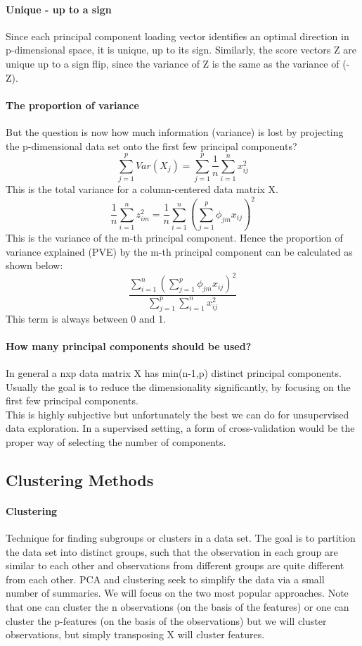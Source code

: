 \documentclass[../document.tex]{subfiles}
\begin{document}
	\paragraph{Unique - up to a sign}
	Since each principal component loading vector identifies an optimal direction in p-dimensional space, it is unique, up to its sign. Similarly, the score vectors Z are unique up to a sign flip, since the variance of Z is the same as the variance of (-Z).
	\paragraph{The proportion of variance}
	But the question is now how much information (variance) is lost by projecting the p-dimensional data set onto the first few principal components?
	\begin{equation}
		\sum_{j=1}^{p}Var(X_{j})=\sum_{j=1}^{p}\frac{1}{n}\sum_{i=1}^{n}x_{ij}^2
	\end{equation}
	This is the total variance for a column-centered data matrix X.
	\begin{equation}
		\frac{1}{n}\sum_{i=1}^{n}z_{im}^2=\frac{1}{n}\sum_{i=1}^{n}(\sum_{j=1}^{p}\phi_{jm}x_{ij})^2
	\end{equation}
	This is the variance of the m-th principal component. Hence the proportion of variance explained (PVE) by the m-th principal component can be calculated as shown below:
	\begin{equation}
		\frac{\sum_{i=1}^{n}(\sum_{j=1}^{p}\phi_{jm}x_{ij})^2}{\sum_{j=1}^{p}\sum_{i=1}^{n}x_{ij}^2}
	\end{equation}
	This term is always between 0 and 1.
	\paragraph{How many principal components should be used?}
	In general a nxp data matrix X has min(n-1,p) distinct principal components. Usually the goal is to reduce the dimensionality significantly, by focusing on the first few principal components.\\
	This is highly subjective but unfortunately the best we can do for unsupervised data exploration. In a supervised setting, a form of cross-validation would be the proper way of selecting the number of components.
	\subsection{Clustering Methods}
	\paragraph{Clustering}
	Technique for finding subgroups or clusters in a data set. The goal is to partition the data set into distinct groups, such that the observation in each group are similar to each other and observations from different groups are quite different from each other. PCA and clustering seek to simplify the data via a small number of summaries. We will focus on the two most popular approaches. Note that one can cluster the n observations (on the basis of the features) or one can cluster the p-features (on the basis of the observations) but we will cluster observations, but simply transposing X will cluster features.
\end{document}
